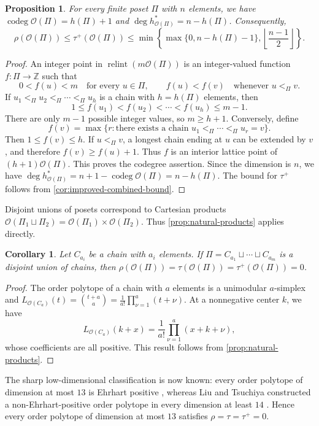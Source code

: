 \documentclass[reqno, 12pt]{article}
\numberwithin{equation}{section}
\newtheorem{proposition}[theorem]{Proposition}
\newtheorem{corollary}[theorem]{Corollary}
\theoremstyle{definition}
\newcommand{\Z}{\mathbb{Z}}
\newcommand{\codeg}{\operatorname{codeg}}
\newcommand{\relint}{\operatorname{relint}}
\begin{document}
\begin{proposition}\label{prop:natural-order-codegree}
For every finite poset $\Pi$ with $n$ elements, we have $\codeg\mathcal O(\Pi)=h(\Pi)+1$ and $\deg h_{\mathcal O(\Pi)}^*=n-h(\Pi)$.
Consequently,
\[\rho(\mathcal O(\Pi))\leq\tau^+(\mathcal O(\Pi))\leq\min\left\{\max\{0,n-h(\Pi)-1\},\left\lfloor\frac {n-1}{2}\right\rfloor\right\}.
\]
\end{proposition}
\begin{proof}
An integer point in $\relint(m\mathcal O(\Pi))$ is an integer-valued
function $f:\Pi\to\Z$ such that
\[0<f(u)<m\quad\text{for every }u\in\Pi,\qquad f(u)<f(v)\quad\text{whenever }u<_\Pi v.
\]
If $u_1<_\Pi u_2<_\Pi\cdots<_\Pi u_h$ is a chain with $h=h(\Pi)$ elements, then
\[ 1\leq f(u_1)<f(u_2)<\cdots<f(u_h)\leq m-1.
\]
There are only $m-1$ possible integer values, so $m\geq h+1$.
Conversely, define
\[f(v)=\max\{r:\text{there exists a chain } u_1<_\Pi\cdots<_\Pi u_r=v\}.
\]
Then $1\leq f(v)\leq h$.  If $u<_\Pi v$, a longest chain ending at
$u$ can be extended by $v$, and therefore $f(v)\geq f(u)+1$.
Thus $f$ is an interior lattice point of $(h+1)\mathcal O(\Pi)$.
This proves the codegree assertion.  Since the dimension is $n$, we have 
$\deg h_{\mathcal O(\Pi)}^*=n+1-\codeg\mathcal O(\Pi)=n-h(\Pi)$.
The bound for $\tau^+$ follows from \cref{cor:improved-combined-bound}.
\end{proof}

Disjoint unions of posets correspond to Cartesian products $\mathcal O(\Pi_1\sqcup\Pi_2)=\mathcal O(\Pi_1)\times\mathcal O(\Pi_2)$.
Thus \cref{prop:natural-products} applies directly.

\begin{corollary}\label{cor:natural-chain-unions}
Let $C_{a_i}$ be a chain with $a_i$ elements. If $\Pi=C_{a_1}\sqcup\cdots\sqcup C_{a_m}$ is a disjoint union of chains, then $\rho(\mathcal O(\Pi))=\tau(\mathcal O(\Pi))=\tau^+(\mathcal O(\Pi))=0$.
\end{corollary}
\begin{proof}
The order polytope of a chain with $a$ elements is a unimodular
$a$-simplex and $L_{\mathcal O(C_a)}(t)=\binom{t+a}{a}=\frac1{a!}\prod_{\nu=1}^{a}(t+\nu)$.
At a nonnegative center $k$, we have 
\[ L_{\mathcal O(C_a)}(k+x)=\frac1{a!}\prod_{\nu=1}^{a}(x+k+\nu),
\]
whose coefficients are all positive. This result follows from \cref{prop:natural-products}.
\end{proof}

The sharp low-dimensional classification is now known: every order
polytope of dimension at most $13$ is Ehrhart positive
\cite[Theorem~3.1]{LiuXinZhang2026}, whereas Liu and Tsuchiya constructed
a non-Ehrhart-positive order polytope in every dimension at least $14$
\cite[Theorem~1.7]{LiuTsuchiya2019}.  Hence every order polytope of
dimension at most $13$ satisfies $\rho=\tau=\tau^+=0$.
\end{document}
